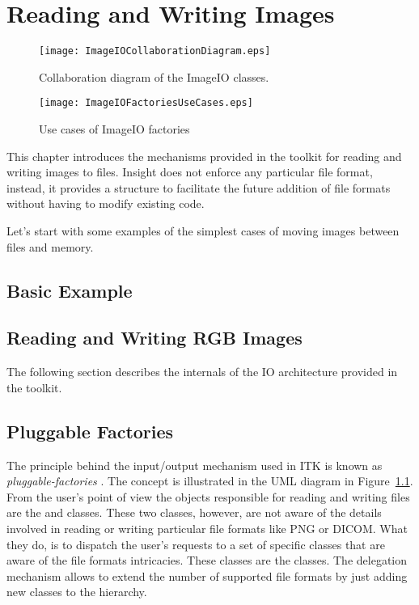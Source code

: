 

\chapter{Reading and Writing Images}
\label{sec:IO}

\begin{figure}
\center
\texttt{[image: ImageIOCollaborationDiagram.eps]}
\caption{Collaboration diagram of the ImageIO classes.}
\label{fig:ImageIOCollaborationDiagram}
\end{figure}

\begin{figure}
\center
\texttt{[image: ImageIOFactoriesUseCases.eps]}
\caption{Use cases of ImageIO factories}
\label{fig:ImageIOFactoriesUseCases}
\end{figure}


This chapter introduces the mechanisms provided in the toolkit for reading and
writing images to files. Insight does not enforce any particular file format,
instead, it provides a structure to facilitate the future addition of file
formats without having to modify existing code. 

Let's start with some examples of the simplest cases of moving images between files
and memory.

\section{Basic Example}
\label{sec:ImagReadWrite}


\section{Reading and Writing RGB Images}
\label{sec:RGBImagReadWrite}



The following section describes the internals of the IO architecture provided
in the toolkit.

\section{Pluggable Factories}
\label{sec:ImageIOPluggableFactories}

The principle behind the input/output mechanism used in ITK is known as
\emph{pluggable-factories} \cite{Gamma1995}. The concept is illustrated in the
UML diagram in Figure~\ref{fig:ImageIOCollaborationDiagram}. From the user's
point of view the objects responsible for reading and writing files are the
 and  classes. These two
classes, however, are not aware of the details involved in reading or writing
particular file formats like PNG or DICOM.  What they do, is to dispatch the
user's requests to a set of specific classes that are aware of the file formats
intricacies. These classes are the  classes. The delegation
mechanism allows to extend the number of supported file formats by just adding
new classes to the  hierarchy.

